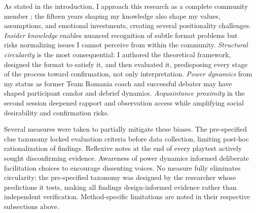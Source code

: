 As stated in the introduction, I approach this research as a complete community member \parencite{adler1987membership}; the fifteen years shaping my knowledge also shape my values, assumptions, and emotional investments, creating several positionality challenges. \textit{Insider knowledge} enables nuanced recognition of subtle format problems but risks normalizing issues I cannot perceive from within the community. \textit{Structural circularity} is the most consequential: I authored the theoretical framework, designed the format to satisfy it, and then evaluated it, predisposing every stage of the process toward confirmation, not only interpretation. \textit{Power dynamics} from my status as former Team Romania coach and successful debater may have shaped participant candor and debrief dynamics. \textit{Acquaintance proximity} in the second session deepened rapport and observation access while amplifying social desirability and confirmation risks.

Several measures were taken to partially mitigate these biases. The pre-specified clue taxonomy locked evaluation criteria before data collection, limiting post-hoc rationalization of findings. Reflexive notes at the end of every playtest actively sought disconfirming evidence. Awareness of power dynamics informed deliberate facilitation choices to encourage dissenting voices. No measure fully eliminates circularity: the pre-specified taxonomy was designed by the researcher whose predictions it tests, making all findings design-informed evidence rather than independent verification. Method-specific limitations are noted in their respective subsections above.

